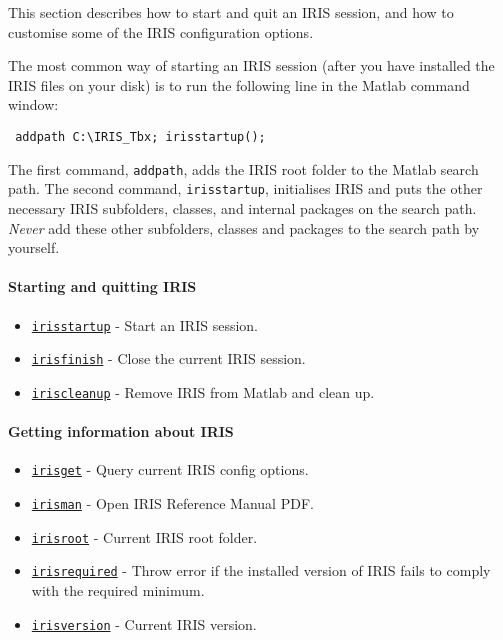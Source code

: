 

	This section describes how to start and quit an IRIS session, and how to
 customise some of the IRIS configuration options.
 
 The most common way of starting an IRIS session (after you have
 installed the IRIS files on your disk) is to run the following line in
 the Matlab command window:
 
 \begin{verbatim}
 addpath C:\IRIS_Tbx; irisstartup();
 \end{verbatim}
 
 The first command, \texttt{addpath}, adds the IRIS root folder to the
 Matlab search path. The second command, \texttt{irisstartup},
 initialises IRIS and puts the other necessary IRIS subfolders, classes,
 and internal packages on the search path. \emph{Never} add these other
 subfolders, classes and packages to the search path by yourself.
 
 \paragraph{Starting and quitting IRIS}
 
 \begin{itemize}
 \item
   \href{config/irisstartup}{\texttt{irisstartup}} - Start an IRIS
   session.
 \item
   \href{config/irisfinish}{\texttt{irisfinish}} - Close the current IRIS
   session.
 \item
   \href{config/iriscleanup}{\texttt{iriscleanup}} - Remove IRIS from
   Matlab and clean up.
 \end{itemize}
 
 \paragraph{Getting information about IRIS}
 
 \begin{itemize}
 \item
   \href{config/irisget}{\texttt{irisget}} - Query current IRIS config
   options.
 \item
   \href{config/irisman}{\texttt{irisman}} - Open IRIS Reference Manual
   PDF.
 \item
   \href{config/irisroot}{\texttt{irisroot}} - Current IRIS root folder.
 \item
   \href{config/irisrequired}{\texttt{irisrequired}} - Throw error if the
   installed version of IRIS fails to comply with the required minimum.
 \item
   \href{config/irisversion}{\texttt{irisversion}} - Current IRIS
   version.
 \end{itemize}
 
